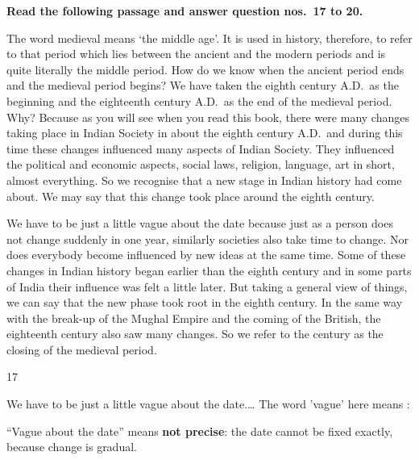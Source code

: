 \begin{context}
\textbf{Read the following passage and answer question nos.~17 to 20.}\par\smallskip
The word medieval means `the middle age'. It is used in history, therefore, to refer to that period which lies between the ancient and the modern periods and is quite literally the middle period. How do we know when the ancient period ends and the medieval period begins? We have taken the eighth century A.D.\ as the beginning and the eighteenth century A.D.\ as the end of the medieval period. Why? Because as you will see when you read this book, there were many changes taking place in Indian Society in about the eighth century A.D.\ and during this time these changes influenced many aspects of Indian Society. They influenced the political and economic aspects, social laws, religion, language, art in short, almost everything. So we recognise that a new stage in Indian history had come about. We may say that this change took place around the eighth century.

We have to be just a little vague about the date because just as a person does not change suddenly in one year, similarly societies also take time to change. Nor does everybody become influenced by new ideas at the same time. Some of these changes in Indian history began earlier than the eighth century and in some parts of India their influence was felt a little later. But taking a general view of things, we can say that the new phase took root in the eighth century. In the same way with the break-up of the Mughal Empire and the coming of the British, the eighteenth century also saw many changes. So we refer to the century as the closing of the medieval period.
\end{context}
\begin{question}{17}
{We have to be just a little vague about the date.\ldots{} The word 'vague' here means :\par}
\begin{explain}
``Vague about the date'' means \textbf{not precise}: the date cannot be fixed exactly, because change is gradual.
\end{explain}
\end{question}

